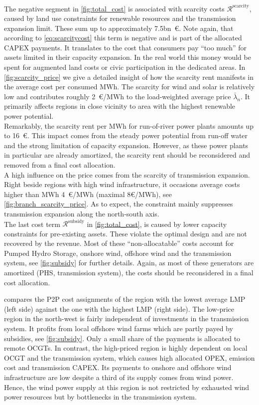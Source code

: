 \documentclass[11pt,twocolumn]{article}
\newcommand{\averagelmp}{\bar{\lambda}_n}
\newcommand{\remainingcost}{\mathcal{R}}
\newcommand{\scarcitycost}{\remainingcost^\text{scarcity}}
\newcommand{\subsidycost}{\remainingcost^\text{subsidy}}
\begin{document}
The negative segment in \cref{fig:total_cost} is associated with scarcity costs $\scarcitycost$, caused by land use constraints for renewable resources and the transmission expansion limit. These sum up to approximately 7.5bn~\euro. Note again, that according to \cref{eq:scarcitycost} this term is negative and is part of the allocated CAPEX payments. It translates to the cost that consumers pay ``too much'' for assets limited in their capacity expansion. In the real world this money would be spent for augmented land costs or civic participation in the dedicated areas. In \cref{fig:scarcity_price} we give a detailed insight of how the scarcity rent manifests in the average cost per consumed MWh. The scarcity for wind and solar is relatively low and contributes roughly 2~\euro/MWh to the load-weighted average price $\averagelmp$. It primarily affects regions in close vicinity to area with the highest renewable power potential. \\
Remarkably, the scarcity rent per MWh for run-of-river power plants amounts up to 16~\euro. This impact comes from the steady power potential from run-off water and the strong limitation of capacity expansion. However, as these power plants in particular are already amortized, the scarcity rent should be reconsidered and removed from a final cost allocation. \\
A high influence on the price comes from the scarcity of transmission expansion. Right beside regions with high wind infrastructure, it occasions average costs higher than MWh 4~\euro/MWh (maximal 8\euro/MWh), see \cref{fig:branch_scarcity_price}. As to expect, the constraint mainly suppresses transmission expansion along the north-south axis.   \\
The last cost term $\subsidycost$ in \cref{fig:total_cost}, is caused by lower capacity constraints for pre-existing assets. These violate the optimal design and are not recovered by the revenue. Most of these ``non-allocatable'' costs account for Pumped Hydro Storage, onshore wind, offshore wind and the transmission system, see \cref{fig:subsidy} for further details. Again, as most of these generators are amortized (PHS, transmission system), the costs should be reconsidered in a final cost allocation. 


 compares the P2P cost assignments of the region with the lowest average LMP (left side) against the one with the highest LMP (right side). The low-price region in the north-west is fairly independent of investments in the transmission system. It profits from local offshore wind farms which are partly payed by subsidies, see \cref{fig:subsidy}. Only a small share of the payments is allocated to remote OCGTs. In contrast, the high-priced region is highly dependent on local OCGT and the transmission system, which causes high allocated OPEX, emission cost and transmission CAPEX. Its payments to  onshore and offshore wind infrastructure are low despite a third of its supply comes from wind power. Hence, the wind power supply at this region is not restricted by exhausted wind power resources but by bottlenecks in the transmission system.  
\end{document}
